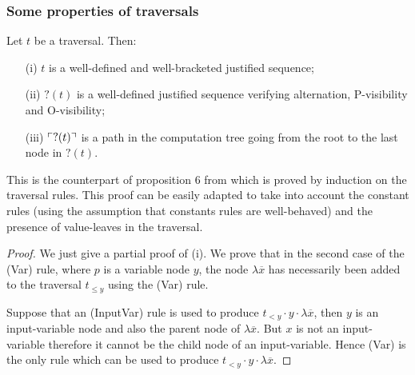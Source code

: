 \subsubsection{Some properties of traversals}

\begin{prop}
\label{prop:pviewtrav_is_path}
Let $t$ be a traversal. Then:
\begin{itemize}
\item[(i)] $t$ is a well-defined and well-bracketed justified sequence;
\item[(ii)] $?(t)$ is a well-defined justified sequence verifying alternation, P-visibility and O-visibility;
\item[(iii)] $\ulcorner ?(t) \urcorner$ is a path in the computation tree going from the root to the last node in $?(t)$.
\end{itemize}
\end{prop}
This is the counterpart of proposition 6 from
\cite{OngHoMchecking2006} which is proved by induction on the
traversal rules. This proof can be easily adapted to take into
account the constant rules (using the assumption that constants
rules are well-behaved) and the presence of value-leaves in the
traversal.
\begin{proof}
We just give a partial proof of (i). We prove that in the second case of the (Var) rule, where $p$ is a variable node $y$,
the node $\lambda \overline{x}$ has necessarily been added to the traversal $t_{\leq y}$ using the (Var) rule.

Suppose that an (InputVar) rule is used to produce $t_{<y} \cdot y
\cdot \lambda \overline{x}$, then $y$ is an input-variable node and
also the parent node of $\lambda \overline{x}$. But $x$ is not an
input-variable therefore it cannot be the child node of an
input-variable. Hence (Var) is the only rule which can be used to
produce $t_{<y} \cdot y \cdot \lambda \overline{x}$.
\end{proof}



